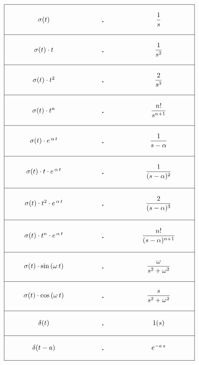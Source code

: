 \let\DS=\displaystyle

{ \[
\begin{array}{|@{\hspace{1cm}}c@{\hspace{2cm}}c@{\hspace{2cm}}c@{\hspace{1cm}}|}
\hline &&\\
\sigma(t) & \FT & \DS\frac{1}{s} \\
&&\\
\hline &&\\
\sigma(t)\cdot t & \FT & \DS\frac{1}{s^2} \\
&&\\
\hline &&\\
\sigma(t)\cdot t^2 & \FT & \DS\frac{2}{s^3} \\
&&\\
\hline &&\\
\sigma(t)\cdot t^n & \FT & \DS\frac{n!}{s^{n+1}} \\
&&\\
\hline &&\\
\sigma(t)\cdot e^{\,\alpha\,t} & \FT & \DS\frac{1}{s-\alpha} \\
&&\\
\hline &&\\
\sigma(t)\cdot t\cdot e^{\,\alpha\,t} & \FT & \DS\frac{1}{(s-\alpha)^2} \\
&&\\
\hline &&\\
\sigma(t)\cdot t^2\cdot e^{\,\alpha\,t} & \FT & \DS\frac{2}{(s-\alpha)^3} \\
&&\\
\hline &&\\
\sigma(t)\cdot t^n\cdot e^{\,\alpha\,t} & \FT & \DS\frac{n!}{(s-\alpha)^{n+1}} \\
&&\\
\hline &&\\
\sigma(t)\cdot\sin\,(\omega\,t) & \FT & \DS\frac{\omega}{s^2+\omega^2} \\
&&\\
\hline &&\\
\sigma(t)\cdot\cos\,(\omega\,t) & \FT & \DS\frac{s}{s^2+\omega^2} \\
&&\\
\hline &&\\
\delta(t) & \FT & 1(s) \\
&&\\
\hline &&\\
\delta(t-a) & \FT & e^{-a\,s} \\
&&\\
\hline \end{array} \] }

